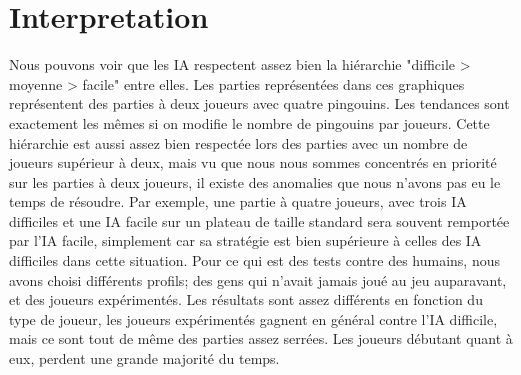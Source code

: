\documentclass{report}
\begin{document}
\section{Interpretation}

Nous pouvons voir que les IA respectent assez bien la hiérarchie "difficile > moyenne > facile" entre elles. 
Les parties représentées dans ces graphiques représentent des parties à deux joueurs avec quatre pingouins. Les tendances sont exactement les mêmes si on modifie le nombre de pingouins par joueurs.
Cette hiérarchie est aussi assez bien respectée lors des parties avec un nombre de joueurs supérieur à deux, mais vu que nous nous sommes concentrés en priorité sur les parties à deux joueurs, il existe des anomalies que nous n'avons pas eu le temps de résoudre.
\newline
Par exemple, une partie à quatre joueurs, avec trois IA difficiles et une IA facile sur un plateau de taille standard sera souvent remportée par l'IA facile, simplement car sa stratégie est bien supérieure à celles des IA difficiles dans cette situation.
\newline
Pour ce qui est des tests contre des humains, nous avons choisi différents profils; des gens qui n'avait jamais joué au jeu auparavant, et des joueurs expérimentés.
Les résultats sont assez différents en fonction du type de joueur, les joueurs expérimentés gagnent en général contre l'IA difficile, mais ce sont tout de même des parties assez serrées.
Les joueurs débutant quant à eux, perdent une grande majorité du temps.
\end{document}
